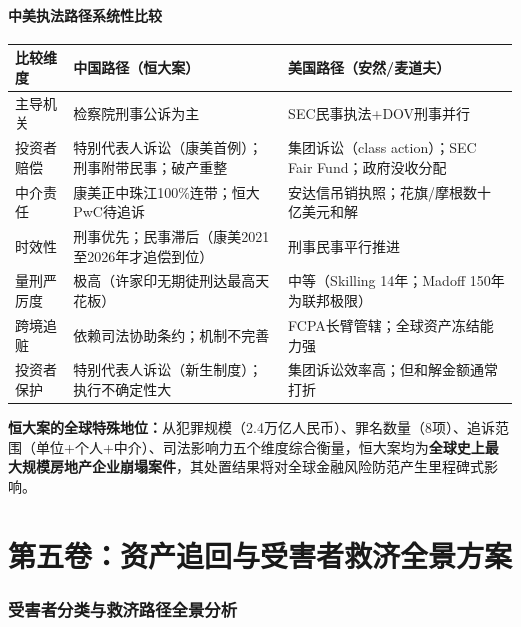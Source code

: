 \documentclass[11pt,a4paper,oneside,openany]{article}
\begin{document}
\subsection{中美执法路径系统性比较}
\begin{threeparttable}
\caption{中国vs美国金融犯罪执法路径系统性比较}
\begin{tabular}{p{2.3cm}p{4.5cm}p{4.5cm}}
\toprule
\textbf{比较维度} & \textbf{中国路径（恒大案）} & \textbf{美国路径（安然/麦道夫）} \\
\midrule
主导机关 & 检察院刑事公诉为主 & SEC民事执法+DOV刑事并行 \\
投资者赔偿 & 特别代表人诉讼（康美首例）；刑事附带民事；破产重整 & 集团诉讼（class action）；SEC Fair Fund；政府没收分配 \\
中介责任 & 康美正中珠江100\%连带；恒大PwC待追诉 & 安达信吊销执照；花旗/摩根数十亿美元和解 \\
时效性 & 刑事优先；民事滞后（康美2021至2026年才追偿到位） & 刑事民事平行推进 \\
量刑严厉度 & 极高（许家印无期徒刑达最高天花板） & 中等（Skilling 14年；Madoff 150年为联邦极限） \\
跨境追赃 & 依赖司法协助条约；机制不完善 & FCPA长臂管辖；全球资产冻结能力强 \\
投资者保护 & 特别代表人诉讼（新生制度）；执行不确定性大 & 集团诉讼效率高；但和解金额通常打折 \\
\bottomrule
\end{tabular}
\end{threeparttable}

\textbf{恒大案的全球特殊地位：}从犯罪规模（2.4万亿人民币）、罪名数量（8项）、追诉范围（单位+个人+中介）、司法影响力五个维度综合衡量，恒大案均为\textbf{全球史上最大规模房地产企业崩塌案件}，其处置结果将对全球金融风险防范产生里程碑式影响。

\newpage
\part{第五卷：资产追回与受害者救济全景方案}

\section{受害者分类与救济路径全景分析}
\end{document}
